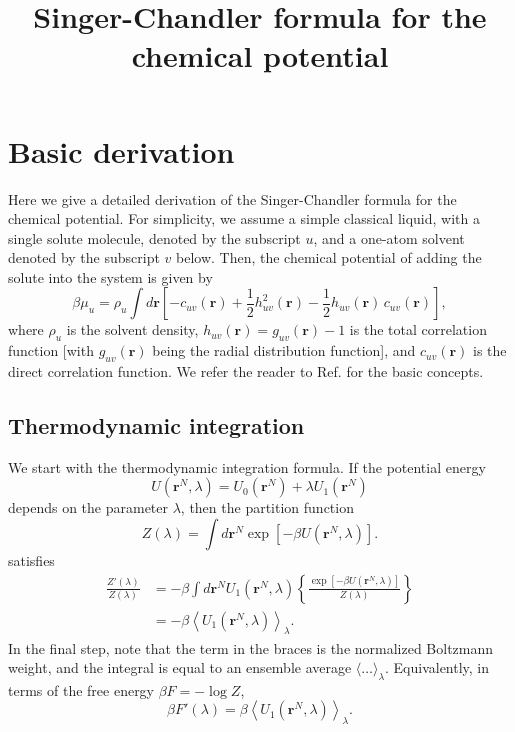 \documentclass[10pt]{article}
\begin{document}
\newcommand{\vct}[1]{\mathbf{#1}}
\newcommand{\vr}{\vct{r}}
\newcommand{\vrN}{\mathbf{r}^N}
\newcommand{\vrn}{\mathbf{r}^n}
\newcommand{\plam}{\partial_\lambda}



\title{Singer-Chandler formula for the chemical potential}
\date{}
\maketitle



\section{Basic derivation}

Here we give a detailed derivation of the Singer-Chandler formula
  for the chemical potential\cite{singer}.
For simplicity, we assume a simple classical liquid,
  with a single solute molecule, denoted by the subscript $u$,
  and a one-atom solvent denoted by the subscript $v$ below.
Then, the chemical potential of adding the solute into
  the system is given by
%
\begin{equation}
\beta \mu_u
  =
  \rho_u \int d\vr
  \left[
    - c_{uv}(\vr)
    + \frac{1}{2} h_{uv}^2(\vr)
    - \frac{1}{2} h_{uv}(\vr) \, c_{uv}(\vr)
  \right],
  \label{eq:singer}
\end{equation}
%
where $\rho_u$ is the solvent density,
  $h_{uv}(\vr) = g_{uv}(\vr) - 1$ is the total correlation function
  [with $g_{uv}(\vr)$ being the radial distribution function],
and $c_{uv}(\vr)$ is the direct correlation function.
We refer the reader to Ref. \cite{hansen}
  for the basic concepts.
%



\subsection{Thermodynamic integration}

We start with the thermodynamic integration formula.
If the potential energy
\[
  U(\vrN, \lambda) = U_0(\vrN) + \lambda U_1(\vrN)
\]
depends on the parameter $\lambda$,
then the partition function
\[
  Z(\lambda) = \int d\vrN \exp[-\beta U(\vrN, \lambda)].
\]
satisfies
\begin{align*}
  \frac{ Z'(\lambda) }{Z(\lambda)}
  &=
    -\beta \int d\vrN U_1(\vrN, \lambda)
    \left\{
      \frac{ \exp
             \left[
             -\beta U(\vrN, \lambda)
             \right]}
      { Z(\lambda) }
    \right\} \\
  &=
    -\beta
    \left\langle
      U_1(\vrN, \lambda)
    \right\rangle_\lambda.
\end{align*}
In the final step, note that the term in the braces
  is the normalized Boltzmann weight,
  and the integral is equal to an ensemble average
  $\langle \dots \rangle_\lambda$.
%
Equivalently, in terms of the free energy $\beta F = -\log Z$,
\begin{equation}
  \beta F'(\lambda)
  = \beta
    \left\langle
      U_1(\vrN, \lambda)
    \right\rangle_\lambda.
\end{equation}
\end{document}
